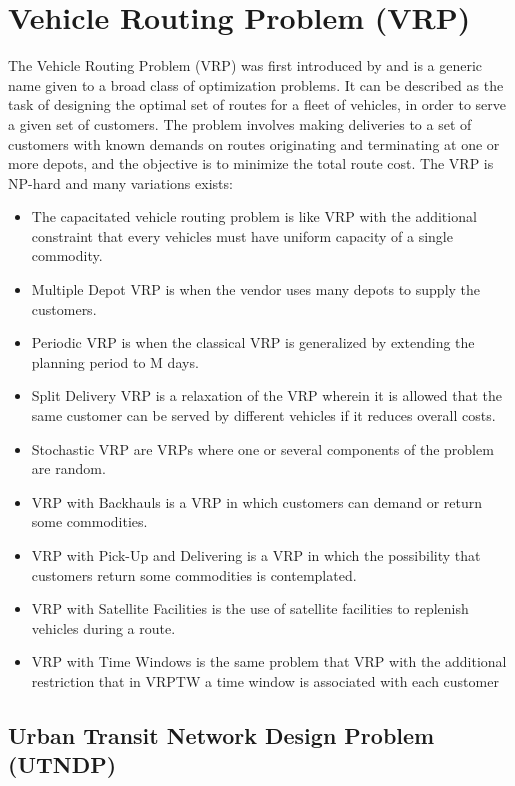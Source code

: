 \section{Vehicle Routing Problem (VRP)}
The Vehicle Routing Problem (VRP) was first introduced by \citet{dantzig59} and is a generic name given to a broad class of optimization problems. It can be described as the task of designing the optimal set of routes for a fleet of vehicles, in order to serve a given set of customers. The problem involves making deliveries to a set of customers with known demands on routes originating and terminating at one or more depots, and the objective is to minimize the total route cost. The VRP is NP-hard and many variations exists:
\begin{itemize}
\item The capacitated vehicle routing problem is like VRP with the additional constraint that every vehicles must have uniform capacity of a single commodity.
\item Multiple Depot VRP is when the vendor uses many depots to supply the customers.
\item Periodic VRP is when the classical VRP is generalized by extending the planning period to M days.
\item Split Delivery VRP is a relaxation of the VRP wherein it is allowed that the same customer can be served by different vehicles if it reduces overall costs. 
\item Stochastic VRP are VRPs where one or several components of the problem are random.
\item VRP with Backhauls is a VRP in which customers can demand or return some commodities.
\item VRP with Pick-Up and Delivering is a VRP in which the possibility that customers return some commodities is contemplated.
\item VRP with Satellite Facilities is the use of satellite facilities to replenish vehicles during a route.
\item VRP with Time Windows is the same problem that VRP with the additional restriction that in VRPTW a time window is associated with each customer
\end{itemize}
\citep{website:neo}

\subsection{Urban Transit Network Design Problem (UTNDP)}


